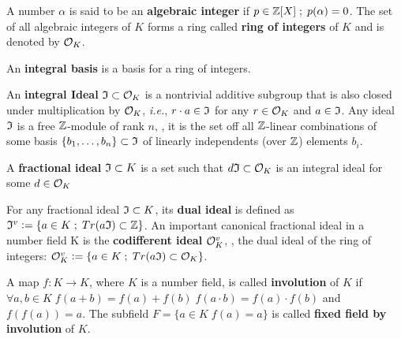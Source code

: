 \documentclass[a4paper,12pt]{article}
\begin{document}
\begin{definition}
A number $\alpha$ is said to be an \textbf{algebraic integer} if $ p \in \mathbb{Z}[X] \;;\; p(\alpha) = 0$. The set of all algebraic integers of $K$ forms a ring called \textbf{ring of integers} of $K$ and is denoted by $\mathcal{O}_K$.
\end{definition}

\begin{definition}
An \textbf{integral basis} is a basis for a ring of integers. 
\end{definition}

\begin{definition}
  An \textbf{integral Ideal} $\mathfrak{I} \subset \mathcal{O}_K$ is a  nontrivial additive subgroup that
  is also closed under multiplication by $\mathcal{O}_K$, \textit{i.e.}, $r \cdot a \in \mathfrak{I}$ for
  any $r \in \mathcal{O}_K$ and $a \in \mathfrak{I}$. Any ideal $\mathfrak{I}$ is a free $\mathbb{Z}$-module of rank
  $n$, \ie, it is the set off all $\mathbb{Z}$-linear combinations of some basis
  $\{b_1,\dots,b_n\} \subset \mathfrak{I}$  of linearly independents (over $\mathbb{Z}$) elements $b_i$.
\end{definition}

\begin{definition}
  A \textbf{fractional ideal} $\mathfrak{I} \subset K$ is a set such that $d\mathfrak{I} \subset \mathcal{O}_K$ is an
  integral ideal for some $d \in \mathcal{O}_K$
\end{definition}

\begin{definition}
  For any fractional ideal $\mathfrak{I} \subset K$, its \textbf{dual ideal} is defined as
  $\mathfrak{I}^v \vcentcolon = \{ a \in K \;;\; Tr(a\mathfrak{I}) \subset \mathbb{Z} \}$. An important canonical
  fractional ideal in a number field K is the \textbf{codifferent ideal}
  $\mathcal{O}_K^v$, \ie, the dual ideal of the ring of integers: $\mathcal{O}_K^v \vcentcolon = \{ a \in K \;;\; Tr(a\mathfrak{I}) \subset \mathcal{O}_K \}$.
\end{definition}

    \begin{definition}
\label{def:fixed-field-by-involution}
      A map $f: K \rightarrow K$, where $K$ is a number field, is called \textbf{involution}
      of $K$ if $\forall a,b \in K \; f(a+b) = f(a) + f(b) \; f(a \cdot b) = f(a) \cdot f(b)$ and
      $f(f(a)) = a$. The subfield $F = \{a \in K \; f(a) = a\}$ is called \textbf{fixed field by
        involution} of $K$.
    \end{definition}
\end{document}

